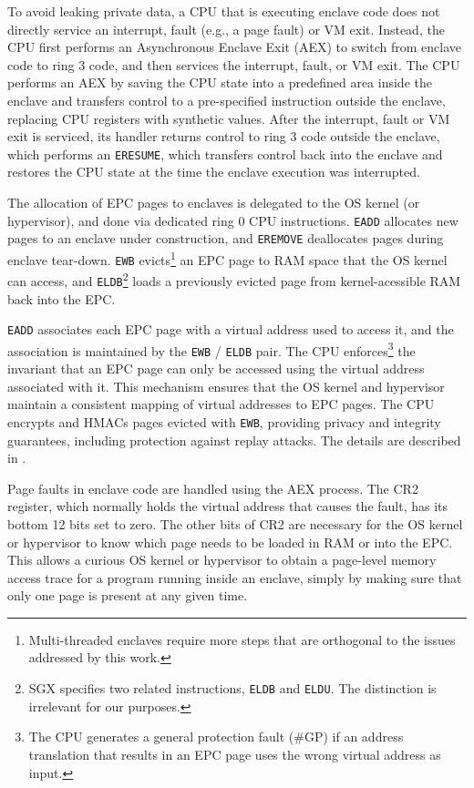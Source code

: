 To avoid leaking private data, a CPU that is executing enclave code does not
directly service an interrupt, fault (e.g., a page fault) or VM exit. Instead,
the CPU first performs an Asynchronous Enclave Exit (AEX) to switch from
enclave code to ring 3 code, and then services the interrupt, fault, or VM
exit.  The CPU performs an AEX by saving the CPU state into a predefined area
inside the enclave and transfers control to a pre-specified instruction outside
the enclave, replacing CPU registers with synthetic values. After the
interrupt, fault or VM exit is serviced, its handler returns control to ring 3
code outside the enclave, which performs an \texttt{ERESUME}, which transfers
control back into the enclave and restores the CPU state at the time the
enclave execution was interrupted.

The allocation of EPC pages to enclaves is delegated to the OS kernel (or
hypervisor), and done via dedicated ring 0 CPU instructions. \texttt{EADD}
allocates new pages to an enclave under construction, and \texttt{EREMOVE}
deallocates pages during enclave tear-down. \texttt{EWB} evicts\footnote{
Multi-threaded enclaves require more steps that are orthogonal to the issues
addressed by this work.} an EPC page to RAM space that the OS kernel can
access, and \texttt{ELDB}\footnote{SGX specifies two related instructions,
\texttt{ELDB} and \texttt{ELDU}. The distinction is irrelevant for our
purposes.} loads a previously evicted page from kernel-acessible RAM back into
the EPC.

\texttt{EADD} associates each EPC page with a virtual address used to access
it, and the association is maintained by the \texttt{EWB} / \texttt{ELDB} pair.
The CPU enforces\footnote{The CPU generates a general protection fault (\#GP)
if an address translation that results in an EPC page uses the wrong virtual
address as input.} the invariant that an EPC page can only be accessed using
the virtual address associated with it. This mechanism ensures that the OS
kernel and hypervisor maintain a consistent mapping of virtual addresses to
EPC pages. The CPU encrypts and HMACs pages evicted with \texttt{EWB},
providing privacy and integrity guarantees, including protection against replay
attacks. The details are described in \cite{intel2015sdm}.

Page faults in enclave code are handled using the AEX process. The CR2
register, which normally holds the virtual address that causes the fault, has
its bottom 12 bits set to zero. The other bits of CR2 are necessary for the OS
kernel or hypervisor to know which page needs to be loaded in RAM or into the
EPC. This allows a curious OS kernel or hypervisor to obtain a page-level
memory access trace for a program running inside an enclave, simply by making
sure that only one page is present at any given time.


